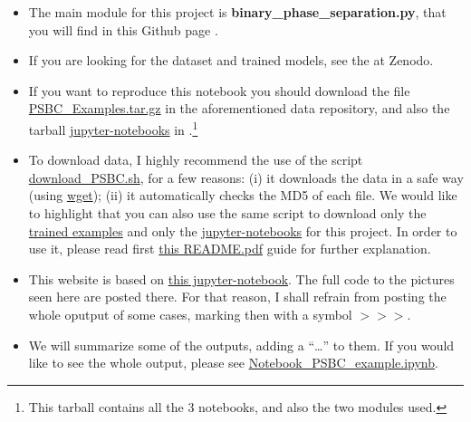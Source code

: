 \documentclass[openany,twoside]{book}
\begin{document}
\begin{itemize}
\item
  The main module for this project is \textbf{binary\_phase\_separation.py}, that you will find in this Github page \citep{Bin_phase_github}.
\item
  If you are looking for the dataset and trained models, see the \citep{Bin_phase_data} at Zenodo.
\item
  If you want to reproduce this notebook you should download the file \href{https://zenodo.org/record/4005131/files/PSBC_Examples.tar.gz?download=1}{PSBC\_Examples.tar.gz} in the aforementioned data repository, and also the tarball \href{https://github.com/rafael-a-monteiro-math/Binary_classification_phase_separation/blob/master/PSBC_Notebooks.tar.gz}{jupyter-notebooks} in \citep{Bin_phase_github}.\footnote{This tarball contains all the 3 notebooks, and also the two modules used.}
\item
  To download data, I highly recommend the use of the script \href{https://github.com/rafael-a-monteiro-math/Binary_classification_phase_separation/blob/master/download_PSBC.sh}{download\_PSBC.sh}, for a few reasons: (i) it downloads the data in a safe way (using \href{https://www.gnu.org/software/wget/}{wget}); (ii) it automatically checks the MD5 of each file. We would like to highlight that you can also use the same script to download only the \href{https://zenodo.org/record/4005131/files/PSBC_Examples.tar.gz?download=1}{trained examples} and only the \href{https://github.com/rafael-a-monteiro-math/Binary_classification_phase_separation/blob/master/PSBC_Notebooks.tar.gz}{jupyter-notebooks} for this project. In order to use it, please read first \href{https://github.com/rafael-a-monteiro-math/Binary_classification_phase_separation/blob/master/README.pdf}{this README.pdf} guide for further explanation.
\item
  This website is based on \href{Notebook_PSBC_example.ipynb}{this jupyter-notebook}. The full code to the pictures seen here are posted there. For that reason, I shall refrain from posting the whole oputput of some cases, marking then with a symbol \(>>>\).
\item
  We will summarize some of the outputs, adding a ``\ldots{}'' to them. If you would like to see the whole output, please see \href{https://github.com/rafael-a-monteiro-math/Binary_classification_phase_separation/blob/master/Notebook_PSBC_examples.ipynb}{Notebook\_PSBC\_example.ipynb}.
\end{itemize}
\end{document}
